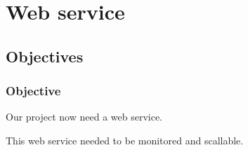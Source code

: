 \section{Web service}

\subsection{Objectives}

	\begin{frame}
		\frametitle{Objective}
		
		Our project now need a web service.

		This web service needed to be monitored and scallable.		
		
	\end{frame}